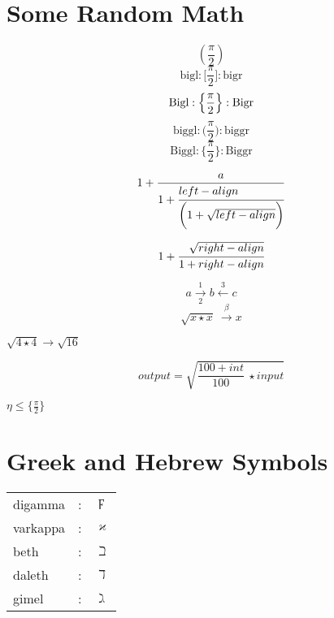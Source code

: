 \documentclass{article}
\begin{document}
\section{Some Random Math}
$$(\frac{\pi}{2})$$
$$\textrm{bigl} : \bigl[ \frac{\pi}{2} \bigr] : \textrm{bigr}$$
$$\textrm{Bigl} : \Bigl\{ \frac{\pi}{2}\Bigr\} : \textrm{Bigr}$$
$$\textrm{biggl} : \biggl( \frac{\pi}{2}\biggr) : \textrm{biggr}$$
$$\textrm{Biggl} : \Biggl\{ \frac{\pi}{2} \Biggr\} : \textrm{Biggr}$$

$$1+\frac{a}{1+\cfrac[l]{left-align}{\biggl(1 + \sqrt{left-align}\biggr)}}$$

$$1+\cfrac[r]{\sqrt{right-align}}{1 + right-align}$$

$$a \xrightarrow[2]{1} b \xleftarrow{3} c$$
$$\sqrt{x \star x}~\xrightarrow{\beta} x$$

$\sqrt{4 \star 4}\rightarrow\sqrt{16}$

$$output = \sqrt{\frac{100+int}{100} ~\star input}$$


$\boxed{\eta \leq \bigl\{\frac{\pi}{2}\bigr\}}$

\section{Greek and Hebrew Symbols}
\begin{tabular}{lll}
digamma & : & $\digamma$\\
varkappa & : & $\varkappa$\\
beth & : & $\beth$\\
daleth & : & $\daleth$\\ 
gimel & : & $\gimel$
\end{tabular}
\end{document}
